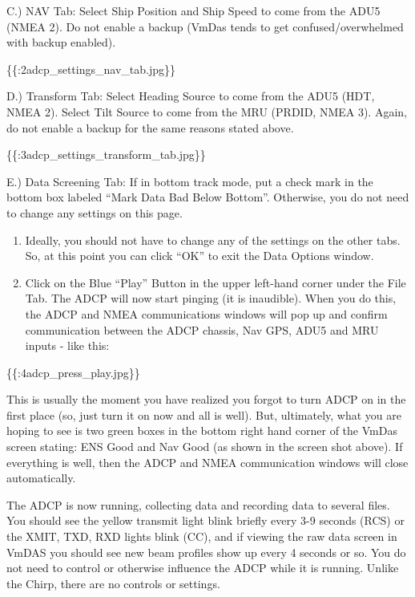 \documentclass[]{book}
\theoremstyle{definition}
\theoremstyle{definition}
\theoremstyle{definition}
\theoremstyle{remark}
\begin{document}
C.) NAV Tab: Select Ship Position and Ship Speed to come from the ADU5
(NMEA 2). Do not enable a backup (VmDas tends to get
confused/overwhelmed with backup enabled).

\{\{:2adcp\_settings\_nav\_tab.jpg\textbar{}\}\}

D.) Transform Tab: Select Heading Source to come from the ADU5 (HDT,
NMEA 2). Select Tilt Source to come from the MRU (PRDID, NMEA 3). Again,
do not enable a backup for the same reasons stated above.

\{\{:3adcp\_settings\_transform\_tab.jpg\textbar{}\}\}

E.) Data Screening Tab: If in bottom track mode, put a check mark in the
bottom box labeled ``Mark Data Bad Below Bottom''. Otherwise, you do not
need to change any settings on this page.

\begin{enumerate}
\def\labelenumi{\arabic{enumi}.}
\setcounter{enumi}{7}
\item
  Ideally, you should not have to change any of the settings on the
  other tabs. So, at this point you can click ``OK'' to exit the Data
  Options window.
\item
  Click on the Blue ``Play'' Button in the upper left-hand corner under
  the File Tab. The ADCP will now start pinging (it is inaudible). When
  you do this, the ADCP and NMEA communications windows will pop up and
  confirm communication between the ADCP chassis, Nav GPS, ADU5 and MRU
  inputs - like this:
\end{enumerate}

\{\{:4adcp\_press\_play.jpg\textbar{}\}\}

This is usually the moment you have realized you forgot to turn ADCP on
in the first place (so, just turn it on now and all is well). But,
ultimately, what you are hoping to see is two green boxes in the bottom
right hand corner of the VmDas screen stating: ENS Good and Nav Good (as
shown in the screen shot above). If everything is well, then the ADCP
and NMEA communication windows will close automatically.

The ADCP is now running, collecting data and recording data to several
files. You should see the yellow transmit light blink briefly every 3-9
seconds (RCS) or the XMIT, TXD, RXD lights blink (CC), and if viewing
the raw data screen in VmDAS you should see new beam profiles show up
every 4 seconds or so. You do not need to control or otherwise influence
the ADCP while it is running. Unlike the Chirp, there are no controls or
settings.
\end{document}
